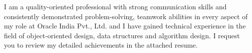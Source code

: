 I am a quality-oriented professional with strong communication skills and consistently demonstrated problem-solving, teamwork abilities in every aspect of my role at Oracle India Pvt., Ltd. and I have gained technical experience in the field of {object-oriented design, data structures and algorithm design}. I request you to review my detailed achievements in the attached resume.